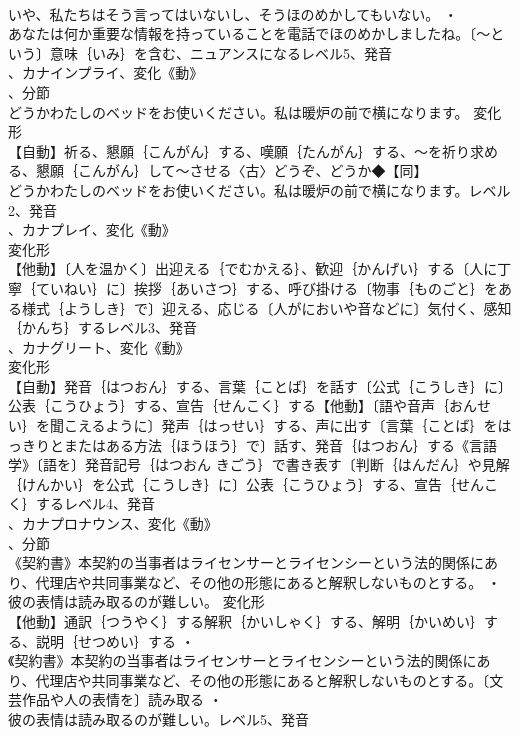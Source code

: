 \documentclass[8pt]{extreport}
\begin{document}
\begin{CJK}{UTF8}{min}
\\	いや、私たちはそう言ってはいないし、そうほのめかしてもいない。 ・
\\	あなたは何か重要な情報を持っていることを電話でほのめかしましたね。〔～という〕意味｛いみ｝を含む、ニュアンスになるレベル5、発音
\\	、カナインプライ、変化《動》
\\	、分節
\\	どうかわたしのベッドをお使いください。私は暖炉の前で横になります。	変化形 
\\	【自動】祈る、懇願｛こんがん｝する、嘆願｛たんがん｝する、～を祈り求める、懇願｛こんがん｝して～させる〈古〉どうぞ、どうか◆【同】
\\	どうかわたしのベッドをお使いください。私は暖炉の前で横になります。レベル2、発音
\\	、カナプレイ、変化《動》
\\	変化形 
\\	【他動】〔人を温かく〕出迎える｛でむかえる｝、歓迎｛かんげい｝する〔人に丁寧｛ていねい｝に〕挨拶｛あいさつ｝する、呼び掛ける〔物事｛ものごと｝をある様式｛ようしき｝で〕迎える、応じる〔人がにおいや音などに〕気付く、感知｛かんち｝するレベル3、発音
\\	、カナグリート、変化《動》
\\	変化形 
\\	【自動】発音｛はつおん｝する、言葉｛ことば｝を話す〔公式｛こうしき｝に〕公表｛こうひょう｝する、宣告｛せんこく｝する【他動】〔語や音声｛おんせい｝を聞こえるように〕発声｛はっせい｝する、声に出す〔言葉｛ことば｝をはっきりとまたはある方法｛ほうほう｝で〕話す、発音｛はつおん｝する《言語学》〔語を〕発音記号｛はつおん きごう｝で書き表す〔判断｛はんだん｝や見解｛けんかい｝を公式｛こうしき｝に〕公表｛こうひょう｝する、宣告｛せんこく｝するレベル4、発音
\\	、カナプロナウンス、変化《動》
\\	、分節
\\	《契約書》本契約の当事者はライセンサーとライセンシーという法的関係にあり、代理店や共同事業など、その他の形態にあると解釈しないものとする。 ・
\\	彼の表情は読み取るのが難しい。	変化形 
\\	【他動】通訳｛つうやく｝する解釈｛かいしゃく｝する、解明｛かいめい｝する、説明｛せつめい｝する ・
\\	《契約書》本契約の当事者はライセンサーとライセンシーという法的関係にあり、代理店や共同事業など、その他の形態にあると解釈しないものとする。〔文芸作品や人の表情を〕読み取る ・
\\	彼の表情は読み取るのが難しい。レベル5、発音

\end{CJK}
\end{document}

